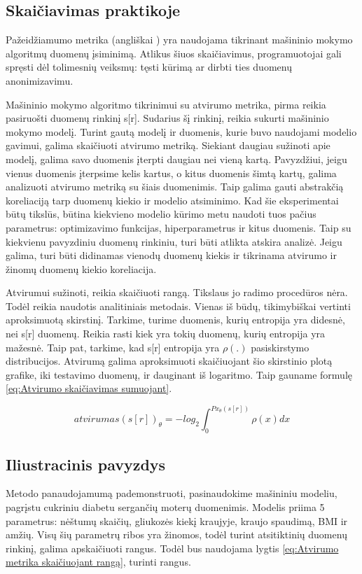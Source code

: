 \documentclass{VUMIFInfBakalaurinis}
\begin{document}
\subsection{Skaičiavimas praktikoje}
\par Pažeidžiamumo metrika  (angliškai ) yra naudojama tikrinant mašininio mokymo algoritmų duomenų įsiminimą. Atlikus šiuos skaičiavimus, programuotojai gali spręsti dėl tolimesnių veiksmų: tęsti kūrimą ar dirbti ties duomenų anonimizavimu.
\par Mašininio mokymo algoritmo tikrinimui su atvirumo metrika, pirma reikia pasiruošti duomenų rinkinį s[r]. Sudarius šį rinkinį, reikia sukurti mašininio mokymo modelį. Turint gautą modelį ir duomenis, kurie buvo naudojami modelio gavimui, galima skaičiuoti atvirumo metriką. Siekiant daugiau sužinoti apie modelį, galima savo duomenis įterpti daugiau nei vieną kartą. Pavyzdžiui, jeigu vienus duomenis įterpsime kelis kartus, o kitus duomenis šimtą kartų, galima analizuoti atvirumo metriką su šiais duomenimis. Taip galima gauti abstrakčią koreliaciją tarp duomenų kiekio ir modelio atsiminimo. Kad šie eksperimentai būtų tikslūs, būtina kiekvieno modelio kūrimo metu naudoti tuos pačius parametrus: optimizavimo funkcijas, hiperparametrus ir kitus duomenis. Taip su kiekvienu pavyzdiniu duomenų rinkiniu, turi būti atlikta atskira analizė. Jeigu galima, turi būti didinamas vienodų duomenų kiekis ir tikrinama atvirumo ir žinomų duomenų kiekio koreliacija.
\par Atvirumui sužinoti, reikia skaičiuoti rangą. Tikslaus jo radimo procedūros nėra. Todėl reikia naudotis analitiniais metodais. Vienas iš būdų, tikimybiškai vertinti aproksimuotą skirstinį. Tarkime, turime duomenis, kurių entropija yra didesnė, nei s[r] duomenų. Reikia rasti kiek yra tokių duomenų, kurių entropija yra mažesnė. Taip pat, tarkime, kad s[r] entropija yra $\rho(.)$ pasiskirstymo distribucijos. Atvirumą galima aproksimuoti skaičiuojant šio skirstinio plotą grafike, iki testavimo duomenų, ir dauginant iš logaritmo.
Taip gauname formulę \eqref{eq:Atvirumo skaičiavimas sumuojant}.

\begin{equation}
atvirumas(s[r])_{\theta} = -log_{2} \int_{0}^{Px_{\theta}(s[r])} \rho(x)dx
\label{eq:Atvirumo skaičiavimas sumuojant}
\end{equation}

\subsection{Iliustracinis pavyzdys}
\par Metodo panaudojamumą pademonstruoti, pasinaudokime mašininiu modeliu, pagrįstu cukriniu diabetu sergančių moterų duomenimis. Modelis priima 5 parametrus: nėštumų skaičių, gliukozės kiekį kraujyje, kraujo spaudimą, BMI ir amžių. Visų šių parametrų ribos yra žinomos, todėl turint atsitiktinių duomenų rinkinį, galima apskaičiuoti rangus. Todėl bus naudojama lygtis \eqref{eq:Atvirumo metrika skaičiuojant rangą}, turinti rangus.
\end{document}
